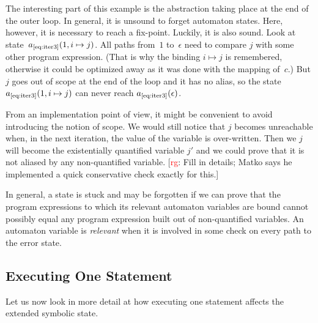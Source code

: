 \documentclass[a4paper]{article}
\newcommand{\todo}[2]{{\small [\textcolor{red}{#1}: #2]}}
\newcommand{\rg}[1]{\todo{rg}{#1}}
\theoremstyle{slanted}
\theoremstyle{definition}
\theoremstyle{remark}
\begin{document}
The interesting part of this example is the abstraction taking place at the end of the outer loop.
In general, it is unsound to forget automaton states.
Here, however, it is necessary to reach a fix-point.
Luckily, it is also sound.
Look at state~$a_\text{\ref{eq:iter3}}(1, i\mapsto j)$.
All paths from~$1$ to~$\epsilon$ need to compare $j$ with some other program expression.
(That is why the binding $i\mapsto j$ is remembered, otherwise it could be optimized away as it was done with the mapping of~$c$.)
But $j$ goes out of scope at the end of the loop and it has no alias, so the state~$a_\text{\ref{eq:iter3}}(1, i\mapsto j)$ can never reach $a_\text{\ref{eq:iter3}}(\epsilon)$.

From an implementation point of view, it might be convenient to avoid introducing the notion of scope.
We would still notice that $j$ becomes unreachable when, in the next iteration, the value of the variable is over-written.
Then we $j$ will become the existentially quantified variable $j'$ and we could prove that it is not aliased by any non-quantified variable.
\rg{Fill in details; Matko says he implemented a quick conservative check exactly for this.}

In general, a state is stuck and may be forgotten if we can prove that the program expressions to which its relevant automaton variables are bound cannot possibly equal any program expression built out of non-quantified variables. An automaton variable is \emph{relevant} when it is involved in some check on every path to the error state.

\subsection{Executing One Statement}\label{sec:execute} %

Let us now look in more detail at how executing one statement affects the extended symbolic state.
\end{document}
